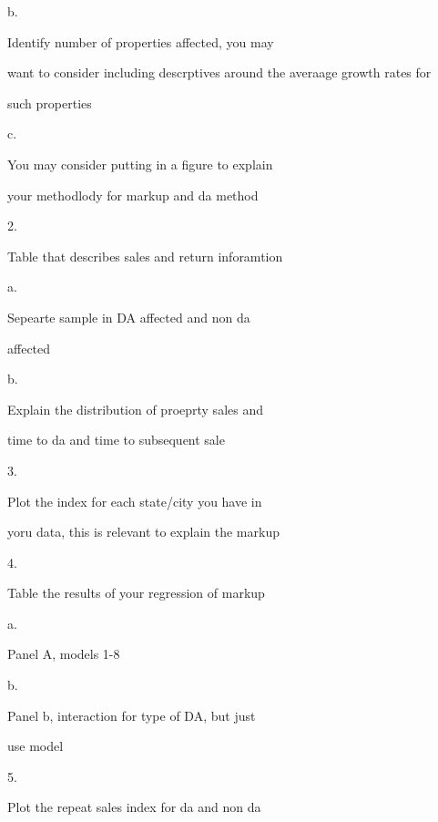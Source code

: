 b.     

Identify number of properties affected, you may

want to consider including descrptives around the averaage growth rates for

such properties





c.     

You may consider putting in a figure to explain

your methodlody for markup and da method





2.     

Table that describes sales and return  inforamtion





a.     

Sepearte sample in DA affected and non da

affected





b.     

Explain the distribution of proeprty sales and

time to da and time to subsequent sale





3.     

Plot the index for each state/city you have in

yoru data, this is relevant to explain the markup





4.     

Table the results of your regression of markup





a.     

Panel A, models 1-8





b.     

Panel b, interaction for type of DA, but just

use model





5.     

Plot the repeat sales index for da and non da

